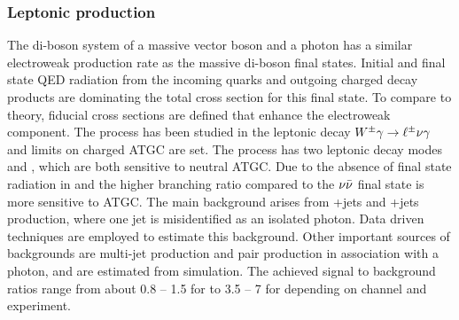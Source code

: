 \subsubsection{Leptonic \Vg production}
\label{sss-Vgammaprod}



The di-boson system of a massive vector boson and a photon has a similar 
electroweak production rate as the massive di-boson final states. Initial
and final state QED radiation from the incoming quarks and
outgoing charged decay products are dominating the total cross section 
for this final state. To compare to theory, fiducial cross sections are defined
that enhance the electroweak component. The \Wg process has been studied in the
leptonic decay $W^{\pm}\gamma \rightarrow \ell^\pm \nu \gamma $ and limits on charged ATGC are set. The \Zg process
has two leptonic decay modes \Zgllg\; and \Zgvvg, which are both sensitive
to neutral ATGC. Due to the absence of final state radiation in \Ztovv\;
and the higher branching ratio compared to \Ztoll\;
the $\nu\bar{\nu}$ final state is more sensitive to ATGC.
The main background arises from \W+jets and \Z+jets production, where one 
jet is misidentified as an isolated photon. Data driven techniques are employed
to estimate this background. Other important sources of backgrounds are multi-jet production
and \ttbar\; pair production in association with a photon, and are estimated from simulation.
The achieved signal to background ratios range from about 0.8 -- 1.5 for \Wglvg\; to 3.5 -- 7 for \Ztoll\;
depending on channel and experiment. 

